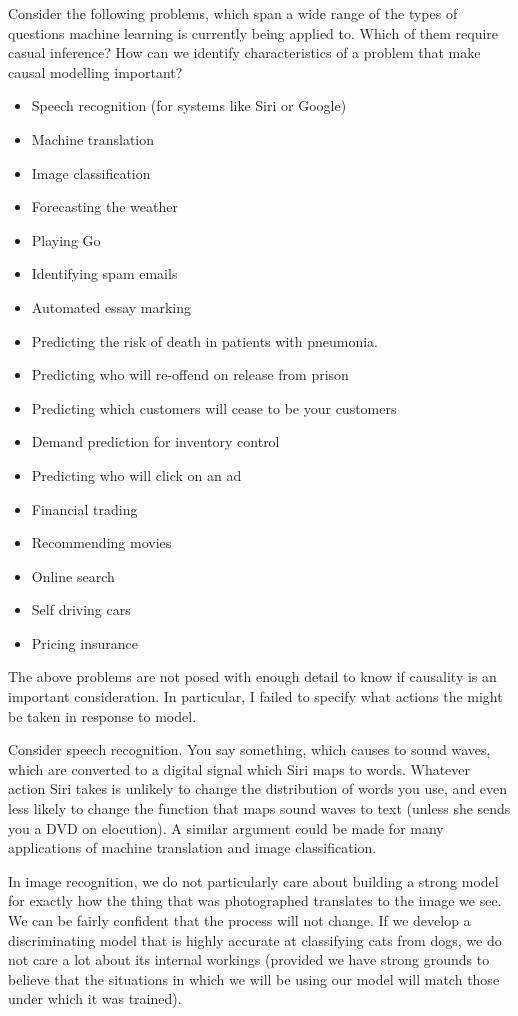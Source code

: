 \documentclass[11pt,a4paper,oneside]{book}
\theoremstyle{plain}
\theoremstyle{definition}
\begin{document}
Consider the following problems, which span a wide range of the types of questions machine learning is currently being applied to. Which of them require casual inference? How can we identify characteristics of a problem that make causal modelling important?

\begin{itemize}
\item Speech recognition (for systems like Siri or Google)
\item Machine translation 
\item Image classification
\item Forecasting the weather
\item Playing Go 
\item Identifying spam emails
\item Automated essay marking
\item Predicting the risk of death in patients with pneumonia.
\item Predicting who will re-offend on release from prison 
\item Predicting which customers will cease to be your customers
\item Demand prediction for inventory control
\item Predicting who will click on an ad
\item Financial trading
\item Recommending movies
\item Online search
\item Self driving cars
\item Pricing insurance
\end{itemize}

The above problems are not posed with enough detail to know if causality is an important consideration. In particular, I failed to specify what actions the might be taken in response to model.

Consider speech recognition. You say something, which causes to sound waves, which are converted to a digital signal which Siri maps to words. Whatever action Siri takes is unlikely to change the distribution of words you use, and even less likely to change the function that maps sound waves to text (unless she sends you a DVD on elocution). A similar argument could be made for many applications of machine translation and image classification. 

In image recognition, we do not particularly care about building a strong model for exactly how the thing that was photographed translates to the image we see. We can be fairly confident that the process will not change. If we develop a discriminating model that is highly accurate at classifying cats from dogs, we do not care a lot about its internal workings (provided we have strong grounds to believe that the situations in which we will be using our model will match those under which it was trained).
\end{document}
